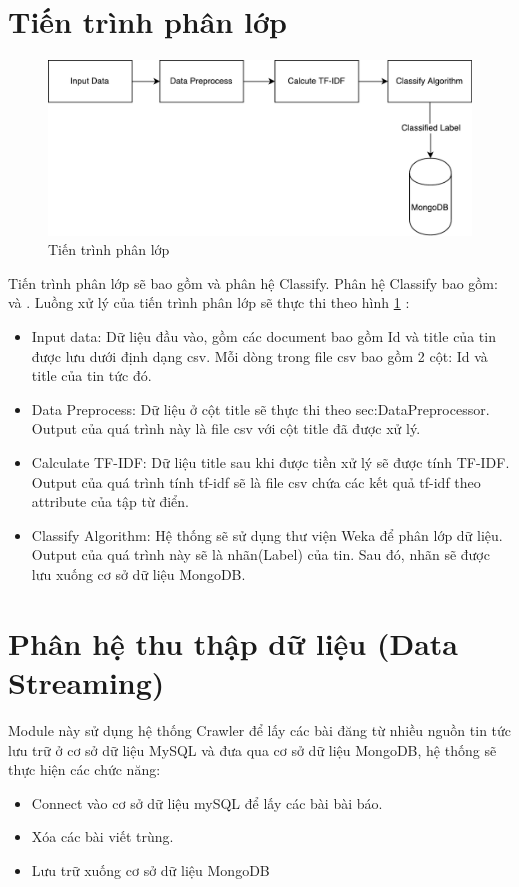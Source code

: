 \section{Tiến trình phân lớp}
\begin{figure}[H]
	\centering
	\includegraphics[width=0.9\linewidth]{Chapter3/Chapter3Figs/PDF/ClassifyProcess}
	\caption{Tiến trình phân lớp}
	\label{fig:classifyprocess}
\end{figure}
Tiến trình phân lớp sẽ bao gồm  và phân hệ Classify.
Phân hệ Classify bao gồm:  và .
Luồng xử lý của tiến trình phân lớp sẽ thực thi theo hình \ref{fig:classifyprocess} :
\begin{itemize}
	\item Input data: Dữ liệu đầu vào, gồm các document bao gồm Id và title của tin được lưu dưới định dạng csv. Mỗi dòng trong file csv bao gồm 2 cột: Id và title của tin tức đó.
	\item Data Preprocess: Dữ liệu ở cột title  sẽ thực thi theo \refname{sec:DataPreprocessor}. Output của quá trình này là file csv với cột title đã được xử lý.
	\item Calculate TF-IDF: Dữ liệu title sau khi được tiền xử lý sẽ được tính TF-IDF. Output của quá trình tính tf-idf sẽ là file csv chứa các kết quả tf-idf theo attribute của tập từ điển.
	\item Classify Algorithm: Hệ thống sẽ sử dụng thư viện Weka để phân lớp dữ liệu. Output của quá trình này sẽ là nhãn(Label) của tin. Sau đó, nhãn sẽ được lưu xuống cơ sở dữ liệu MongoDB.
\end{itemize}

\section{Phân hệ thu thập dữ liệu (Data Streaming)} \label{sec:DataStreaming}
Module này sử dụng hệ thống Crawler để lấy các bài đăng từ nhiều nguồn tin tức lưu trữ ở cơ sở dữ liệu MySQL và đưa qua cơ sở dữ liệu MongoDB, hệ thống sẽ thực hiện các chức năng:
	\begin{itemize}
		\item Connect vào cơ sở dữ liệu mySQL để lấy các bài bài báo.
		\item Xóa các bài viết trùng.
		\item Lưu trữ xuống cơ sở dữ liệu MongoDB
	\end{itemize}
